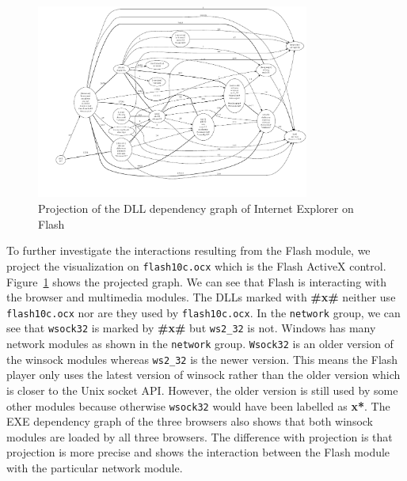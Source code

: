 \begin{figure}
\centering
\includegraphics[keepaspectratio,width=0.8\textwidth,height=0.8\textheight]{depvis/ie-yt-proj.pdf}
\caption{Projection of the DLL dependency graph of Internet Explorer on Flash}
\label{fig:ie-proj}
\end{figure}

To further investigate the interactions resulting from the Flash module,
we project the visualization on {\tt flash10c.ocx} which is
the Flash ActiveX control.
Figure~\ref{fig:ie-proj} shows the projected graph.
We can see that Flash is interacting with the browser and multimedia modules.
The DLLs marked with {\bf \#x\#} neither use {\tt flash10c.ocx}
nor are they used by {\tt flash10c.ocx}.
In the {\tt network} group,
we can see that {\tt wsock32} is marked by {\bf \#x\#} but
{\tt ws2\_32} is not.
Windows has many network modules as shown in the {\tt network} group.
{\tt Wsock32} is an
older version of the winsock modules whereas {\tt ws2\_32} is the newer version.
This means the Flash player only uses the latest version of winsock rather
than the older version which is closer to the Unix socket API.
However, the older version is still used by some other modules
because otherwise {\tt wsock32} would have been labelled as {\bf *x*}.
The EXE dependency graph of the three browsers also shows that
both winsock modules are loaded by all three browsers.
The difference with projection is that projection is
more precise and shows the interaction between
the Flash module with the particular network module.
